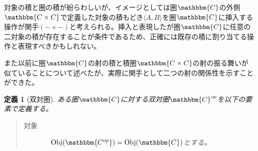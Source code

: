 \documentclass[dvipdfmx]{jsarticle}
\newcommand{\cat}[1]{\mathbbm{#1}}
\newcommand{\tuple}[1]{\langle #1\rangle}
\newcommand{\obj}[1]{\mathrm{Obj}(\cat{#1})}
\newtheorem{define}{定義}[section]
\numberwithin{proof}{subsection}
\numberwithin{prop}{subsection}
\numberwithin{define}{subsection}
\begin{document}
	対象の積と圏の積が紛らわしいが、イメージとしては圏$\cat{C}$の外側$\cat{C\times C}$で定義した対象の積もどき$\tuple{A,B}$を圏$\cat{C}$に挿入する操作が関手$(-\times-)$と考えられる。挿入と表現したが圏$\cat{C}$に任意の二対象の積が存在することが条件であるため、正確には既存の積に割り当てる操作と表現すべきかもしれない。

	また以前に圏$\cat{C}$の射の積と積圏$\cat{C\times C}$の射の振る舞いが似ていることについて述べたが、実際に関手として二つの射の関係性を示すことができた。
	\begin{define}[双対圏]
		ある圏$\cat{C}$に対する双対圏$\cat{C}^{op}$を以下の要素で定義する。
		\begin{quote}
			\begin{description}
				\item[対象]　$\obj{C^{op}}=\obj{C}$とする。


\end{description}
\end{quote}
\end{define}
\end{document}
